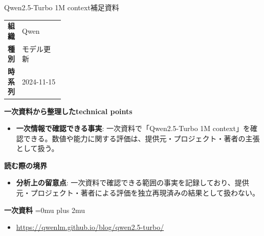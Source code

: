 \begin{technicalnote}{Qwen2.5-Turbo 1M context}{補足資料}
\begingroup
\begin{tabularx}{\linewidth}{@{}>{\bfseries}p{0.22\linewidth}X@{}}
組織 & Qwen \\
種別 & モデル更新 \\
時系列 & 2024-11-15 \\
\end{tabularx}
\smallskip
{\bfseries 一次資料から整理したtechnical points}
\begin{itemize}[leftmargin=1.5em,itemsep=0.35em]
\item \textbf{一次情報で確認できる事実}: 一次資料で「Qwen2.5-Turbo 1M context」を確認できる。数値や能力に関する評価は、提供元・プロジェクト・著者の主張として扱う。
\end{itemize}
\begin{minipage}{\linewidth}
{\bfseries 読む際の境界}
\begin{itemize}[leftmargin=1.5em,itemsep=0.35em]
\item \textbf{分析上の留意点}: 一次資料で確認できる範囲の事実を記録しており、提供元・プロジェクト・著者による評価を独立再現済みの結果として扱わない。
\end{itemize}
\begin{samepage}
{\bfseries 一次資料}
\begingroup\sloppy
\Urlmuskip=0mu plus 2mu\relax
\begin{itemize}[leftmargin=1.5em,itemsep=0.25em]
\item {\scriptsize\url{https://qwenlm.github.io/blog/qwen2.5-turbo/}}
\end{itemize}
\endgroup
\end{samepage}
\end{minipage}
\endgroup
\end{technicalnote}
\medskip

